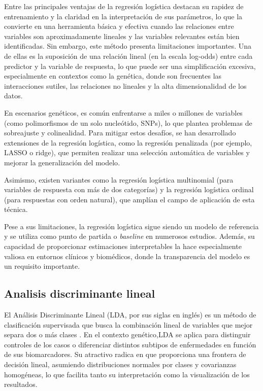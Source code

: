\documentclass[11pt,a4paper,spanish]{book}
\numberwithin{equation}{chapter}
\numberwithin{figure}{chapter}
\begin{document}
Entre las principales ventajas de la regresión logística destacan su rapidez de entrenamiento y la claridad en la interpretación de sus parámetros, lo que la convierte en una herramienta básica y efectiva cuando las relaciones entre variables son aproximadamente lineales y las variables relevantes están bien identificadas\cite{hosmer_2013}. Sin embargo, este método presenta limitaciones importantes. Una de ellas es la suposición de una relación lineal (en la escala log-odds) entre cada predictor y la variable de respuesta, lo que puede ser una simplificación excesiva, especialmente en contextos como la genética, donde son frecuentes las interacciones sutiles, las relaciones no lineales y la alta dimensionalidad de los datos.\cite{wutong_2009}

En escenarios genéticos, es común enfrentarse a miles o millones de variables (como polimorfismos de un solo nucleótido, SNPs), lo que plantea problemas de sobreajuste y colinealidad\cite{bush_2012}. Para mitigar estos desafíos, se han desarrollado extensiones de la regresión logística, como la regresión penalizada (por ejemplo, LASSO o ridge), que permiten realizar una selección automática de variables y mejorar la generalización del modelo\cite{wutong_2009}.

Asimismo, existen variantes como la regresión logística multinomial (para variables de respuesta con más de dos categorías) y la regresión logística ordinal (para respuestas con orden natural), que amplían el campo de aplicación de esta técnica.

Pese a sus limitaciones, la regresión logística sigue siendo un modelo de referencia y se utiliza como punto de partida o \textit{baseline} en numerosos estudios\cite{10.1093/eurheartj/ehu207}. Además, su capacidad de proporcionar estimaciones interpretables la hace especialmente valiosa en entornos clínicos y biomédicos, donde la transparencia del modelo es un requisito importante\cite{rudin_2019}.

\subsection{Analisis discriminante lineal}

El Análisis Discriminante Lineal (LDA, por sus siglas en inglés) es un método de clasificación supervisada que busca la combinación lineal de variables que mejor separa dos o más clases\cite{Ghojogh_2019} . En el contexto genético,LDA se aplica para distinguir controles de los casos o diferenciar distintos subtipos de enfermedades en función de sus biomarcadores\cite{CHEN2012}. Su atractivo radica en que proporciona una frontera de decisión lineal, asumiendo distribuciones normales por clases y covarianzas homogéneas, lo que facilita tanto su interpretación como la visualización de los resultados\cite{10.1093/bioinformatics/btx150}.
\end{document}
